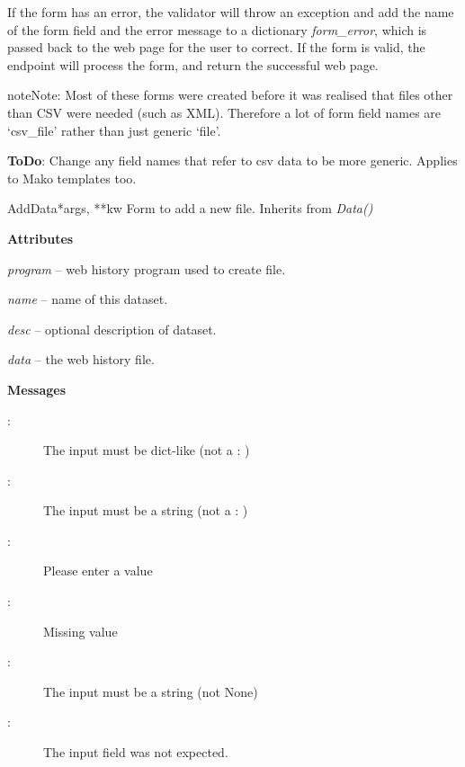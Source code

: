 \documentclass[letterpaper,10pt,english]{manual}
\begin{document}
If the form has an error, the validator will throw an exception and add the name of the 
form field and the error message to a dictionary \emph{form\_error}, which is passed back to the 
web page for the user to correct. If the form is valid, the endpoint will process the form, 
and return the successful web page.

\begin{notice}{note}{Note:}
Most of these forms were created before it was realised that files other than CSV were needed
(such as XML). 
Therefore a lot of form field names are `csv\_file' rather than just generic `file'.

\textbf{ToDo}: Change any field names that refer to csv data to be more generic. Applies to Mako
templates too.
\end{notice}

\hypertarget{webscavator.forms.forms.AddData}{}\begin{classdesc}{AddData}{*args, **kw}
Form to add a new file. Inherits from \emph{Data()}

\textbf{Attributes}

\emph{program} -- web history program used to create file.

\emph{name} -- name of this dataset.

\emph{desc} -- optional description of dataset.

\emph{data} -- the web history file.

\textbf{Messages}
\begin{description}
\item[:]
The input must be dict-like (not a : )

\item[:]
The input must be a string (not a : )

\item[:]
Please enter a value

\item[:]
Missing value

\item[:]
The input must be a string (not None)

\item[:]
The input field  was not expected.

\end{description}
\end{classdesc}
\end{document}
